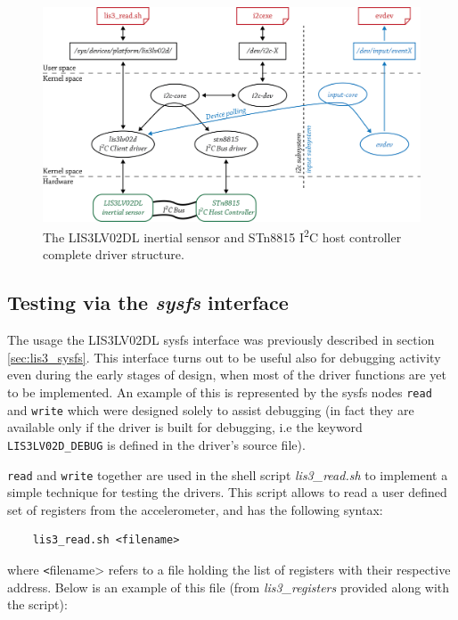 \documentclass[a4paper,10pt]{article}
\newcommand{\iic}{I\textsuperscript{2}C }
\newcommand{\keyword}[1]{\texttt{#1}}
\begin{document}
\begin{multicols}{2}
\begin{figure}[t]
 \centering
 \includegraphics[width=15cm]{./figures/nhk8815-whole-driver-system.png}
 \caption{The LIS3LV02DL inertial sensor and STn8815 \iic host controller
 	complete driver structure.}
 \label{fig:whole-driver-system}
\end{figure}


\subsection{Testing via the \emph{sysfs} interface}
\label{sec:sysfs-testing}
The usage the LIS3LV02DL sysfs interface was previously described in section
\ref{sec:lis3_sysfs}.
This interface turns out to be useful also for debugging activity even
during the early stages of design, when most of the driver functions are yet
to be implemented.
An example of this is represented by the sysfs nodes \keyword{read} and
\keyword{write} which were designed solely to assist debugging (in fact they
are available only if the driver is built for debugging, i.e the keyword \keyword{LIS3LV02D\_DEBUG} is defined in the driver's source file). 

\keyword{read} and \keyword{write} together are used in the shell script
\emph{lis3\_read.sh} to implement a simple technique for testing the drivers.
This script allows to read a user defined set of registers from the accelerometer,
and has the following syntax:
\begin{verbatim}
	lis3_read.sh <filename>
\end{verbatim}
where \keyword <filename> refers to a file holding the list of registers with
their respective address. Below is an example of this file (from 
\emph{lis3\_registers} provided along with the script):


\end{multicols}
\end{document}
